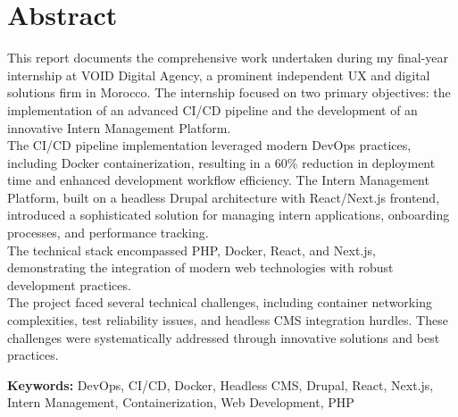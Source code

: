 \chapter*{Abstract}
\thispagestyle{empty}
\vspace*{1cm}

\indent This report documents the comprehensive work undertaken during my final-year internship at VOID Digital Agency, a prominent independent UX and digital solutions firm in Morocco. The internship focused on two primary objectives: the implementation of an advanced CI/CD pipeline and the development of an innovative Intern Management Platform.\\[0.5em]

\indent The CI/CD pipeline implementation leveraged modern DevOps practices, including Docker containerization, resulting in a 60\% reduction in deployment time and enhanced development workflow efficiency. The Intern Management Platform, built on a headless Drupal architecture with React/Next.js frontend, introduced a sophisticated solution for managing intern applications, onboarding processes, and performance tracking.\\[0.5em]

\indent The technical stack encompassed PHP, Docker, React, and Next.js, demonstrating the integration of modern web technologies with robust development practices.\\[0.5em]

\indent The project faced several technical challenges, including container networking complexities, test reliability issues, and headless CMS integration hurdles. These challenges were systematically addressed through innovative solutions and best practices.

\vspace{1cm}
\textbf{Keywords:} DevOps, CI/CD, Docker, Headless CMS, Drupal, React, Next.js, Intern Management, Containerization, Web Development, PHP

\clearpage


